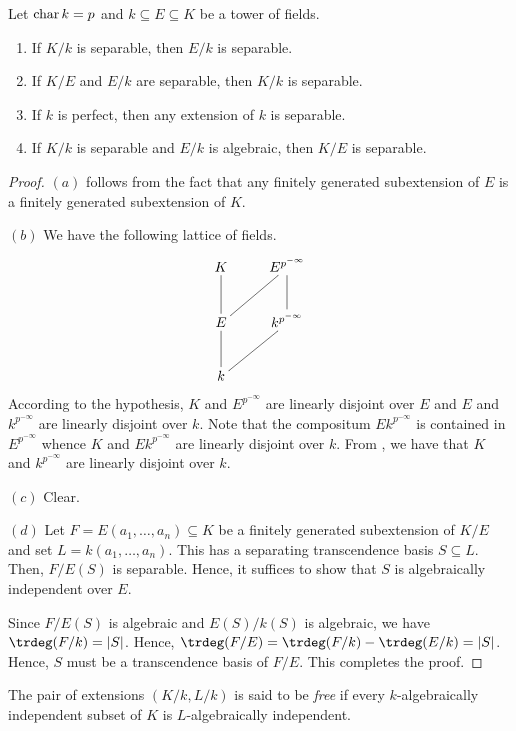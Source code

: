 \begin{theorem}
    Let $\operatorname{char} k = p$ and $k\subseteq E\subseteq K$ be a tower of fields. 
    \begin{enumerate}[label=(\alph*)]
        \item If $K/k$ is separable, then $E/k$ is separable. 
        \item If $K/E$ and $E/k$ are separable, then $K/k$ is separable. 
        \item If $k$ is perfect, then any extension of $k$ is separable. 
        \item If $K/k$ is separable and $E/k$ is algebraic, then $K/E$ is separable.
    \end{enumerate}
\end{theorem}
\begin{proof}
    $(a)$ follows from the fact that any finitely generated subextension of $E$ is a finitely generated subextension of $K$.

    $(b)$ We have the following lattice of fields. 
    \begin{equation*}
        \xymatrix {
            K & E^{p^{-\infty}}\ar@{-}[d]\\
            E\ar@{-}[u]\ar@{-}[ru] & k^{p^{-\infty}}\\
            k\ar@{-}[ru]\ar@{-}[u] & 
        }
    \end{equation*}
    According to the hypothesis, $K$ and $E^{p^{-\infty}}$ are linearly disjoint over $E$ and $E$ and $k^{p^{-\infty}}$ are linearly disjoint over $k$. Note that the compositum $Ek^{p^{-\infty}}$ is contained in $E^{p^{-\infty}}$ whence $K$ and $Ek^{p^{-\infty}}$ are linearly disjoint over $k$. From , we have that $K$ and $k^{p^{-\infty}}$ are linearly disjoint over $k$.

    $(c)$ Clear.

    $(d)$ Let $F = E(a_1,\dots,a_n)\subseteq K$ be a finitely generated subextension of $K/E$ and set $L = k(a_1,\dots,a_n)$. This has a separating transcendence basis $S\subseteq L$. Then, $F/E(S)$ is separable. Hence, it suffices to show that $S$ is algebraically independent over $E$. 

    Since $F/E(S)$ is algebraic and $E(S)/k(S)$ is algebraic, we have $\trdeg(F/k) = |S|$. Hence, $\trdeg(F/E) = \trdeg(F/k) - \trdeg(E/k) = |S|$. Hence, $S$ must be a transcendence basis of $F/E$. This completes the proof.
\end{proof}

\begin{definition}[Free]
    The pair of extensions $(K/k, L/k)$ is said to be \emph{free} if every $k$-algebraically independent subset of $K$ is $L$-algebraically independent.
\end{definition}

